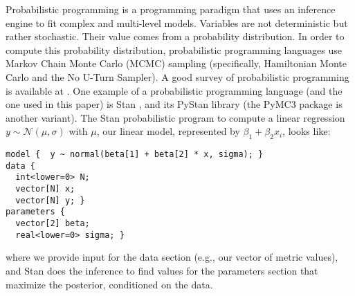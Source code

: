 \documentclass[sigconf,natbib=false]{acmart}
\begin{document}

Probabilistic programming is a programming paradigm that uses an inference
engine to fit complex and multi-level models. Variables are not deterministic
but rather stochastic. Their value comes from a probability distribution. In
order to compute this probability distribution, probabilistic programming
languages use Markov Chain Monte Carlo (MCMC) sampling (specifically,
Hamiltonian Monte Carlo and the No U-Turn Sampler). 
A good survey of probabilistic programming is available at \cite{Quarashi}.
One example of a probabilistic programming language (and the one used in this
paper) is Stan \cite{Carpenter2017}, and its PyStan library (the PyMC3 package
is another variant). The Stan probabilistic program to compute a linear
regression $y \sim \mathcal{N}(\mu,\sigma)$ with $\mu$, our linear model,
represented by $\beta_1 + \beta_2 x_i$, looks like:

\begin{verbatim}
model {  y ~ normal(beta[1] + beta[2] * x, sigma); }
data {
  int<lower=0> N; 
  vector[N] x;
  vector[N] y; }
parameters {
  vector[2] beta;
  real<lower=0> sigma; } 
\end{verbatim}

where we provide input for the data section (e.g., our vector of metric values),
and Stan does the inference to find values for the parameters section that
maximize the posterior, conditioned on the data. 

\end{document}
